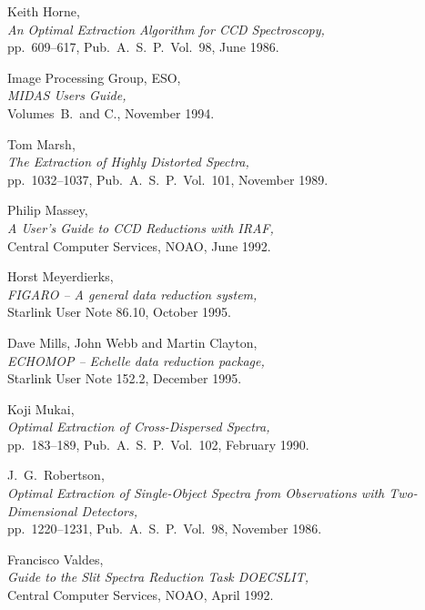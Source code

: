 \documentclass[twoside,11pt]{article}
\newcommand{\htmladdnormallink}[2]{#1}
\newcommand{\xref}[3]{#1}
\newcommand{\sgspec}[2]{#1}
\newcommand{\sgspec}[2]{#2}
\begin{document}
\begin{thebibliography}{999}
 Keith Horne,\\
      {\sl An Optimal Extraction Algorithm for CCD Spectroscopy,}\\
      pp.~609\sgspec{--}{-}617, Pub.~A.~S.~P.~Vol.~98, June 1986.

 Image Processing Group, ESO,\\
      {\sl MIDAS Users Guide,}\\
      Volumes~B.~and C., November 1994.

 Tom Marsh,\\
      {\sl The Extraction of Highly Distorted Spectra,}\\
      pp.~1032\sgspec{--}{-}1037, Pub.~A.~S.~P.~Vol.~101, November 1989.

 Philip Massey,\\
      {\sl
      \htmladdnormallink{A User's Guide to CCD Reductions with IRAF}
      {ftp://starlink-ftp.rl.ac.uk/pub/iraf/iraf/docs/ccduser2.ps.Z},}\\
      Central Computer Services, NOAO, June 1992.

 Horst Meyerdierks,\\
      {\sl \xref{FIGARO \sgspec{--}{-} A general data reduction system}
      {sun86}{},}\\
      Starlink User Note 86.10, October 1995.

 Dave Mills, John Webb and Martin Clayton,\\
      {\sl \xref{ECHOMOP \sgspec{--}{-} Echelle data reduction package}
      {sun152}{},}\\
      Starlink User Note 152.2, December 1995.

 Koji Mukai,\\
    {\sl Optimal Extraction of Cross-Dispersed Spectra,}\\
    pp.~183\sgspec{--}{-}189, Pub.~A.~S.~P.~Vol.~102, February 1990.

 J.~G.~Robertson,\\
     {\sl Optimal Extraction of Single-Object Spectra from Observations
     with Two-Dimensional Detectors,}\\
     pp.~1220\sgspec{--}{-}1231, Pub.~A.~S.~P.~Vol.~98, November 1986.

 Francisco Valdes,\\
      {\sl
      \htmladdnormallink{Guide to the Slit Spectra Reduction Task DOECSLIT}
      {ftp://starlink-ftp.rl.ac.uk/pub/iraf/iraf/docs/doecslit.ps.Z},}\\
      Central Computer Services, NOAO, April 1992.


\end{thebibliography}
\end{document}
